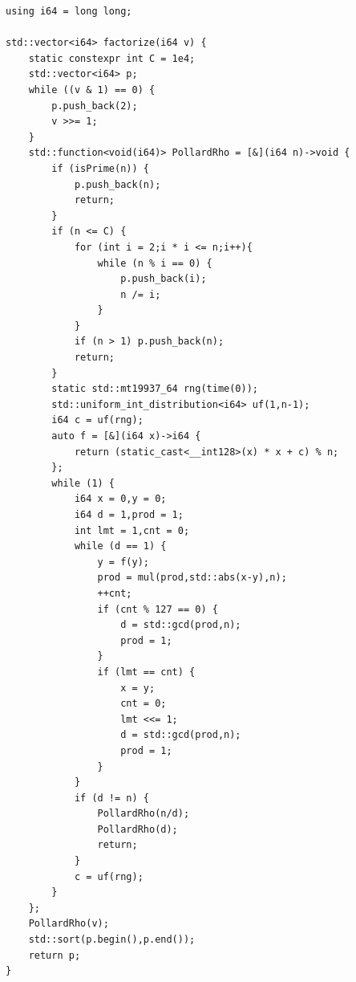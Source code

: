\begin{lstlisting}
using i64 = long long;

std::vector<i64> factorize(i64 v) {
    static constexpr int C = 1e4;
    std::vector<i64> p;
    while ((v & 1) == 0) {
        p.push_back(2);
        v >>= 1;
    }
    std::function<void(i64)> PollardRho = [&](i64 n)->void {
        if (isPrime(n)) {
            p.push_back(n);
            return;
        }
        if (n <= C) {
            for (int i = 2;i * i <= n;i++){
                while (n % i == 0) {
                    p.push_back(i);
                    n /= i;
                }
            }
            if (n > 1) p.push_back(n);
            return;
        }
        static std::mt19937_64 rng(time(0));
        std::uniform_int_distribution<i64> uf(1,n-1);
        i64 c = uf(rng);
        auto f = [&](i64 x)->i64 {
            return (static_cast<__int128>(x) * x + c) % n;
        };
        while (1) {
            i64 x = 0,y = 0;
            i64 d = 1,prod = 1;
            int lmt = 1,cnt = 0;
            while (d == 1) {
                y = f(y);
                prod = mul(prod,std::abs(x-y),n);
                ++cnt;
                if (cnt % 127 == 0) {
                    d = std::gcd(prod,n);
                    prod = 1;
                }
                if (lmt == cnt) {
                    x = y;
                    cnt = 0;
                    lmt <<= 1;
                    d = std::gcd(prod,n);
                    prod = 1;
                }
            }
            if (d != n) {
                PollardRho(n/d);
                PollardRho(d);
                return;
            }
            c = uf(rng);
        }
    };
    PollardRho(v);
    std::sort(p.begin(),p.end());
    return p;
}
\end{lstlisting}
